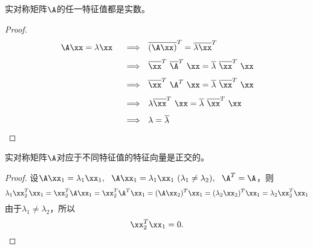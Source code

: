 \begin{dingli}
  实对称矩阵$\A$的任一特征值都是实数。
\end{dingli}
\begin{proof}
$$
\begin{array}{rl}
  \A\xx = \lambda \xx
  &~~\Longrightarrow~~
    \overline{(\A\xx)}^T = \overline{\lambda \xx}^T\\[0.1in]
  &~~\Longrightarrow~~
    \overline{\xx}^T~\overline{\A}^T~\xx = \overline{\lambda} ~\overline{\xx}^T~\xx\\[0.1in]
  &~~\Longrightarrow~~
    \overline{\xx}^T~\A^T~\xx = \overline{\lambda} ~\overline{\xx}^T~\xx\\[0.1in]
  &~~\Longrightarrow~~
    \lambda \overline{\xx}^T~\xx = \overline{\lambda} ~\overline{\xx}^T~\xx\\[0.1in]
  &~~\Longrightarrow~~
    \lambda = \overline \lambda
\end{array}
$$
\end{proof}






\begin{dingli}
  实对称矩阵$\A$对应于不同特征值的特征向量是正交的。
\end{dingli}
\begin{proof}
设$\A\xx_1=\lambda_1\xx_1,~~\A\xx_1=\lambda_1\xx_1~ (\lambda_1\ne\lambda_2), ~~\A^T=\A$，则
$$
\lambda_1\xx_2^T\xx_1=\xx_2^T\A\xx_1=\xx_2^T\A^T\xx_1=(\A\xx_2)^T\xx_1=(\lambda_2\xx_2)^T\xx_1=\lambda_2\xx_2^T\xx_1
$$
由于$\lambda_1\ne\lambda_2$，所以
$$
\xx_2^T\xx_1=0.
$$
\end{proof}



